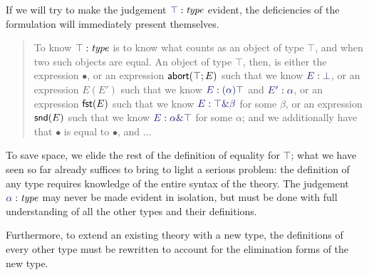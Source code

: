 \documentclass[main.tex]{subfiles}
\begin{document}
If we will try to make the judgement $\type\top$ evident, the deficiencies of
the formulation will immediately present themselves.

\begin{quote}
To know $\type\top$ is to know what counts as an object of type $\top$, and when
two such objects are equal. An object of type $\top$, then, is either the
expression $\bullet$, or an expression $\mathsf{abort}(\top;E)$ such that we know
$\ofty{E}{\bot}$, or an expression $E(E')$ such that we know $\ofty{E}{(\alpha)\top}$ and
$\ofty{E'}{\alpha}$, or an expression $\mathsf{fst}(E)$ such that we know $\ofty{E}{\product\top\beta}$
for some $\beta$, or an expression $\mathsf{snd}(E)$ such that we know
$\ofty{E}{\product\alpha\top}$ for some $\alpha$; and we additionally have that $\bullet$
is equal to $\bullet$, and ...
\end{quote}

To save space, we elide the rest of the definition of equality for $\top$; what
we have seen so far already suffices to bring to light a serious problem: the
definition of any type requires knowledge of the entire syntax of the theory.
The judgement $\type\alpha$ may never be made evident in isolation, but must be
done with full understanding of all the other types and their definitions.

Furthermore, to extend an existing theory with a new type, the definitions of
every other type must be rewritten to account for the elimination forms of the
new type.
\end{document}
